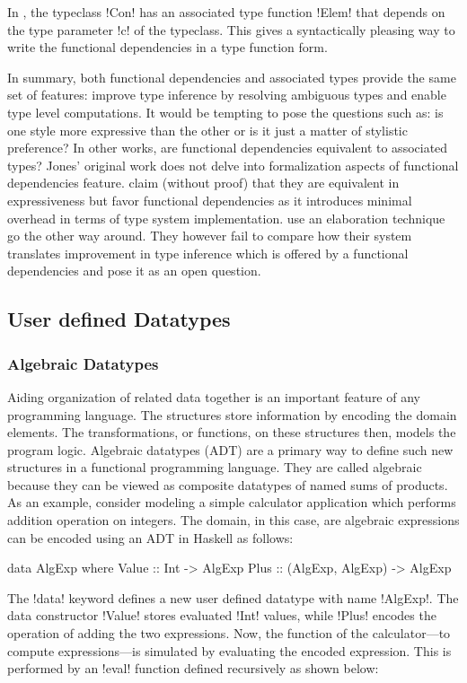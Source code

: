 \documentclass[manuscript,screen,nonacm]{acmart}
\begin{document}
In , the typeclass !Con! has an associated type function !Elem! that depends on the type parameter !c! of the typeclass. This gives a syntactically pleasing way to write the functional dependencies in a type function form.

In summary, both functional dependencies and associated types provide the same set of features: improve type inference by resolving ambiguous types and enable type level computations. It would be tempting to pose the questions such as: is one style more expressive than the other or is it just a matter of stylistic preference? In other works, are functional dependencies equivalent to associated types? Jones' original work does not delve into formalization aspects of functional dependencies feature. \citet{jones_language_2008} claim (without proof) that they are equivalent in expressiveness but favor functional dependencies as it introduces minimal overhead in terms of type system implementation. \citet{karachalias_elaboration_2017} use an elaboration technique go the other way around. They however fail to compare how their system translates improvement in type inference which is offered by a functional dependencies and pose it as an open question.

\subsection{User defined Datatypes}
\subsubsection{Algebraic Datatypes}
Aiding organization of related data together is an important feature of any programming language. The structures store information by encoding the domain elements. The transformations, or functions, on these structures then, models the program logic. Algebraic datatypes (ADT) are a primary way to define such new structures in a functional programming language. They are called algebraic because they can be viewed as composite datatypes of named sums of products. As an example, consider modeling a simple calculator application which performs addition operation on integers. The domain, in this case, are algebraic expressions can be encoded using an ADT in Haskell as follows:

\begin{CenteredBox}
\begin{code}
data AlgExp where
 Value :: Int -> AlgExp
 Plus :: (AlgExp, AlgExp) -> AlgExp
\end{code}
\end{CenteredBox}
The !data! keyword defines a new user defined datatype with name !AlgExp!.
The data constructor !Value! stores evaluated !Int! values, while !Plus! encodes the operation of adding the two expressions. Now, the function of the calculator---to compute expressions---is simulated by evaluating the encoded expression. This is performed by an !eval! function defined recursively as shown below:
\end{document}
